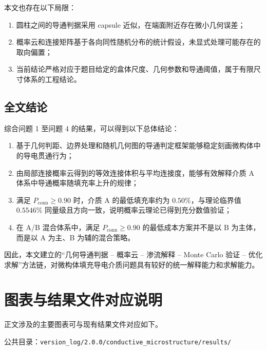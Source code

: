 本文也存在以下局限：
\begin{enumerate}
    \item 圆柱之间的导通判据采用 capsule 近似，在端面附近存在微小几何误差；
    \item 概率云和连接矩阵基于各向同性随机分布的统计假设，未显式处理可能存在的取向偏置；
    \item 当前结论严格对应于题目给定的盒体尺度、几何参数和导通阈值，属于有限尺寸体系的工程结论。
\end{enumerate}

\subsection{全文结论}

综合问题 1 至问题 4 的结果，可以得到以下总体结论：
\begin{enumerate}
    \item 基于几何判距、边界处理和随机几何图的导通判定框架能够稳定刻画微构体中的导电贯通行为；
    \item 由局部连接概率云得到的等效连接体积与平均连接度，能够有效解释介质 A 体系中导通概率随填充率上升的规律；
    \item 满足 $P_{\mathrm{conn}}\ge 0.90$ 时，介质 A 的最低填充率约为 $0.50\%$，与理论临界值 $0.5546\%$ 同量级且方向一致，说明概率云理论已得到充分数值验证；
    \item 在 A/B 混合体系中，满足 $P_{\mathrm{conn}}\ge 0.90$ 的最低成本方案并不是以 B 为主体，而是以 A 为主、B 为辅的混合策略。
\end{enumerate}

因此，本文建立的“几何导通判据 -- 概率云 -- 渗流解释 -- Monte Carlo 验证 -- 优化求解”方法链，对微构体填充导电介质问题具有较好的统一解释能力和求解能力。

\section*{图表与结果文件对应说明}

正文涉及的主要图表可与现有结果文件对应如下。

公共目录：\texttt{version\_log/2.0.0/conductive\_microstructure/results/}

